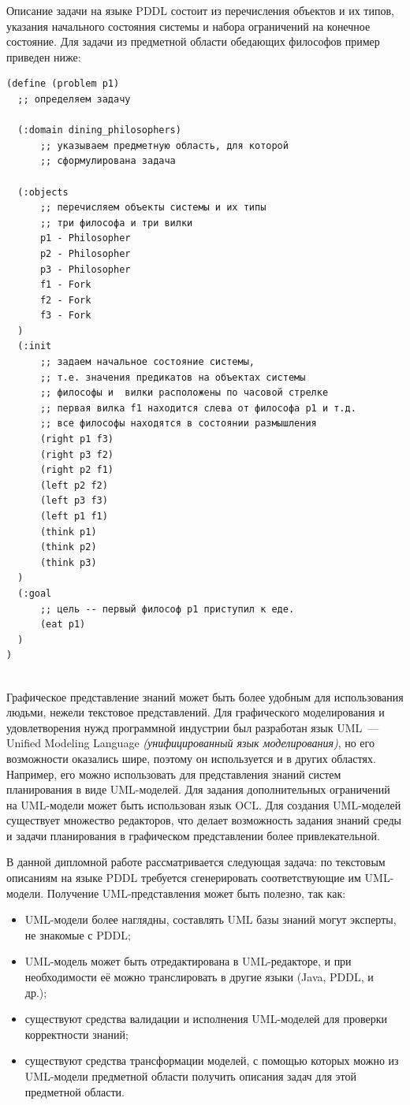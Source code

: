 \documentclass[a4paper,14pt]{extreport}
\begin{document}
    Описание задачи на языке PDDL состоит из перечисления объектов и их типов, указания начального состояния системы и набора ограничений на конечное состояние. Для задачи из предметной области обедающих философов пример приведен ниже:
  
\linespread{0.80}
\begin{verbatim}
(define (problem p1)
  ;; определяем задачу
  
  (:domain dining_philosophers)
      ;; указываем предметную область, для которой
      ;; сформулирована задача  
  
  (:objects
      ;; перечисляем объекты системы и их типы
      ;; три философа и три вилки      
      p1 - Philosopher
      p2 - Philosopher
      p3 - Philosopher
      f1 - Fork
      f2 - Fork
      f3 - Fork
  )
  (:init
      ;; задаем начальное состояние системы, 
      ;; т.е. значения предикатов на объектах системы
      ;; философы и  вилки расположены по часовой стрелке
      ;; первая вилка f1 находится слева от философа p1 и т.д.
      ;; все философы находятся в состоянии размышления
      (right p1 f3)
      (right p3 f2)
      (right p2 f1)
      (left p2 f2)
      (left p3 f3)
      (left p1 f1)
      (think p1)
      (think p2)
      (think p3)
  )
  (:goal
      ;; цель -- первый философ p1 приступил к еде.
      (eat p1)
  )
)
    
\end{verbatim}
\linespread{1.25}

    Графическое представление знаний может быть более удобным для использования людьми, нежели текстовое представлений. Для графического моделирования и удовлетворения нужд программной индустрии был разработан язык UML\cite{rambo-uml2}~--- Unified Modeling Language \textit{(унифицированный язык моделирования)}, но его возможности оказались шире, поэтому он используется и в других областях. Например, его можно использовать для представления знаний систем планирования в виде UML-моделей. Для задания дополнительных ограничений на UML-модели может быть использован язык OCL\cite{ocl}. Для создания UML-моделей существует множество редакторов, что делает возможность задания знаний среды и задачи планирования в графическом представлении более привлекательной. 
    
    В данной дипломной работе рассматривается следующая задача: по текстовым описаниям на языке PDDL требуется сгенерировать соответствующие им UML-модели. Получение UML-представления может быть полезно, так как:
    \begin{itemize}
        \item UML-модели более наглядны, составлять UML базы знаний могут эксперты, не знакомые с PDDL;
        \item UML-модель может быть отредактирована в UML-редакторе, и при необходимости её можно транслировать в другие языки (Java, PDDL, и~ др.);
        \item существуют средства валидации и исполнения UML-моделей для проверки корректности знаний\cite{use}; 
        \item существуют средства трансформации моделей, с помощью которых можно из UML-модели предметной области получить описания задач для этой предметной области.
    \end{itemize}
\end{document}
